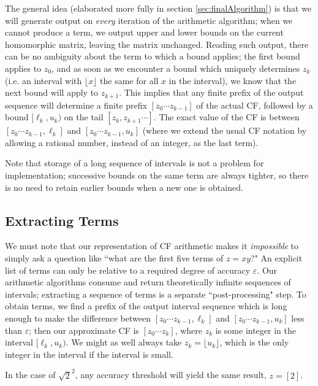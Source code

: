 \documentclass[11pt, oneside]{amsart}   	%
\begin{document}
The general idea (elaborated more fully in section \ref{sec:finalAlgorithm}) is that we will generate output on \emph{every}
 iteration of the arithmetic algorithm; when we cannot produce a term, we output upper and lower bounds on the current homomorphic matrix, leaving the matrix unchanged. Reading such output, there can be no ambiguity about the term to which a bound 
 applies; the first bound applies to $z_0$, and as soon as we encounter a bound which uniquely determines $z_k$ (i.e. an interval with $\lfloor x \rfloor$ the same for all $x$ in the interval), we know that the next bound will apply to $z_{k+1}$. This implies that any 
 finite prefix of the output sequence will determine a finite prefix $[z_0 \cdots z_{k-1}]$ of the actual CF, followed by a bound $[\ell_k,u_k)$ on the tail $[z_k, z_{k+1}\cdots]$. The exact value of the CF is between $[z_0 \cdots z_{k-1}, \ell_k]$ and $[z_0 \cdots z_{k-1}, u_k]$ (where we extend the usual CF notation by allowing a rational number, instead of an integer, as the last term).

Note that storage of a long sequence of intervals is not a problem for implementation; successive bounds on the same term are always tighter, so there is no need to retain earlier bounds when a new one is obtained. 

\subsection{Extracting Terms}
We must note that our representation of CF arithmetic makes it \emph{impossible} to simply ask a question like ``what are the first five terms of $z = xy$?" An explicit list of terms can only be relative to a required degree of accuracy $\varepsilon$. Our arithmetic algorithms consume and return theoretically infinite sequences of intervals; extracting a sequence of terms is a separate ``post-processing" step. To obtain terms, we find a prefix of the output interval sequence which is long enough to make the difference between $[z_0 \cdots z_{k-1}, \ell_k]$ and $[z_0 \cdots z_{k-1}, u_k]$ less than $\varepsilon$; then our approximate CF is $[z_0 \cdots z_k]$, where $z_k$ is some integer in the interval $[\ell_k,u_k)$. We might as well always take $z_k = \lfloor u_k \rfloor$, which is the only integer in the interval if the interval is small. 

In the case of $\sqrt{2}^2$, any accuracy threshold will yield the same result, $z = [2]$.
\end{document}
